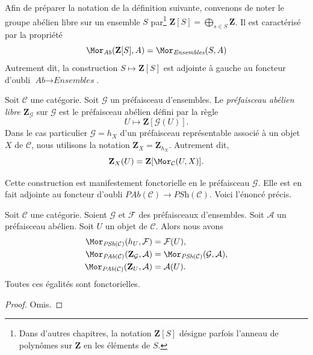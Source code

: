 \noindent
Afin de préparer la notation de la définition suivante, convenons de noter le
groupe abélien libre sur un ensemble $S$ par\footnote{Dans d'autres chapitres,
la notation $\mathbf{Z}[S]$ désigne parfois l'anneau de polynômes sur
$\mathbf{Z}$ en les éléments de $S$.}
$\mathbf{Z}[S] = \bigoplus_{s \in S} \mathbf{Z}$. Il est caractérisé par la
propriété
$$
\Mor_{\textit{Ab}}(\mathbf{Z}[S], A)
=
\Mor_{\textit{Ensembles}}(S, A)
$$
Autrement dit, la construction $S \mapsto \mathbf{Z}[S]$ est adjointe à
gauche au foncteur d'oubli $\textit{Ab} \to \textit{Ensembles}$.

\begin{definition}
\label{definition-free-abelian-presheaf-on}
Soit $\mathcal{C}$ une catégorie. Soit $\mathcal{G}$ un préfaisceau
d'ensembles. Le {\it préfaisceau abélien libre}
$\mathbf{Z}_\mathcal{G}$ sur $\mathcal{G}$ est le préfaisceau abélien défini
par la règle
$$
U \longmapsto \mathbf{Z}[\mathcal{G}(U)].
$$
Dans le cas particulier $\mathcal{G} = h_X$ d'un préfaisceau représentable
associé à un objet $X$ de $\mathcal{C}$, nous utilisons la notation
$\mathbf{Z}_X = \mathbf{Z}_{h_X}$. Autrement dit,
$$
\mathbf{Z}_X(U) = \mathbf{Z}[\Mor_\mathcal{C}(U, X)].
$$
\end{definition}

\noindent
Cette construction est manifestement fonctorielle en le préfaisceau
$\mathcal{G}$. Elle est en fait adjointe au foncteur d'oubli
$\textit{PAb}(\mathcal{C}) \to \textit{PSh}(\mathcal{C})$. Voici l'énoncé
précis.

\begin{lemma}
\label{lemma-obvious-adjointness}
Soit $\mathcal{C}$ une catégorie. Soient $\mathcal{G}$ et $\mathcal{F}$ des
préfaisceaux d'ensembles. Soit $\mathcal{A}$ un préfaisceau abélien. Soit $U$
un objet de $\mathcal{C}$. Alors nous avons
\begin{align*}
\Mor_{\textit{PSh}(\mathcal{C})}(h_U, \mathcal{F})
& =
\mathcal{F}(U), \\
\Mor_{\textit{PAb}(\mathcal{C})}(\mathbf{Z}_\mathcal{G}, \mathcal{A})
& =
\Mor_{\textit{PSh}(\mathcal{C})}(\mathcal{G}, \mathcal{A}), \\
\Mor_{\textit{PAb}(\mathcal{C})}(\mathbf{Z}_U, \mathcal{A})
& =
\mathcal{A}(U).
\end{align*}
Toutes ces égalités sont fonctorielles.
\end{lemma}

\begin{proof}
Omis.
\end{proof}

